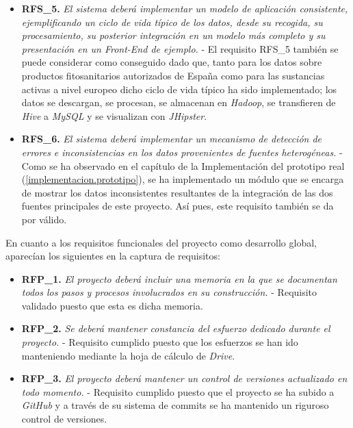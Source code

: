 \begin{itemize}
 \item \textbf{RFS\_5. } \textit{El sistema deberá implementar un modelo de aplicación consistente, ejemplificando un ciclo de vida típico de los datos, desde su recogida, su procesamiento, su posterior integración en un modelo más completo y su presentación en un \textit{Front-End} de ejemplo.} - El requisito RFS\_5 también se puede considerar como conseguido dado que, tanto para los datos sobre productos fitosanitarios autorizados de España como para las sustancias activas a nivel europeo dicho ciclo de vida típico ha sido implementado; los datos se descargan, se procesan, se almacenan en \textit{Hadoop}, se transfieren de \textit{Hive} a \textit{MySQL} y se visualizan con \textit{JHipster}.
 \item \textbf{RFS\_6. } \textit{El sistema deberá implementar un mecanismo de detección de errores e inconsistencias en los datos provenientes de fuentes heterogéneas.} - Como se ha observado en el capítulo de la Implementación del prototipo real (\ref{implementacion.prototipo}), se ha implementado un módulo que se encarga de mostrar los datos inconsistentes resultantes de la integración de las dos fuentes principales de este proyecto. Así pues, este requisito también se da por válido. 
 \end{itemize}
 
 En cuanto a los requisitos funcionales del proyecto como desarrollo global, aparecían los siguientes en la captura de requisitos: 
\begin{itemize}
\item \textbf{RFP\_1. }
\textit{El proyecto deberá incluir una memoria en la que se documentan todos los pasos y procesos involucrados en su construcción.} - Requisito validado puesto que esta es dicha memoria. 
\item \textbf{RFP\_2. }
\textit{Se deberá mantener constancia del esfuerzo dedicado durante el proyecto.} - Requisito cumplido puesto que los esfuerzos se han ido manteniendo mediante la hoja de cálculo de \textit{Drive}.
\item \textbf{RFP\_3. }
\textit{El proyecto deberá mantener un control de versiones actualizado en todo momento. } - Requisito cumplido puesto que el proyecto se ha subido a \textit{GitHub} y a través de su sistema de commits se ha mantenido un riguroso control de versiones.
\end{itemize}
 
